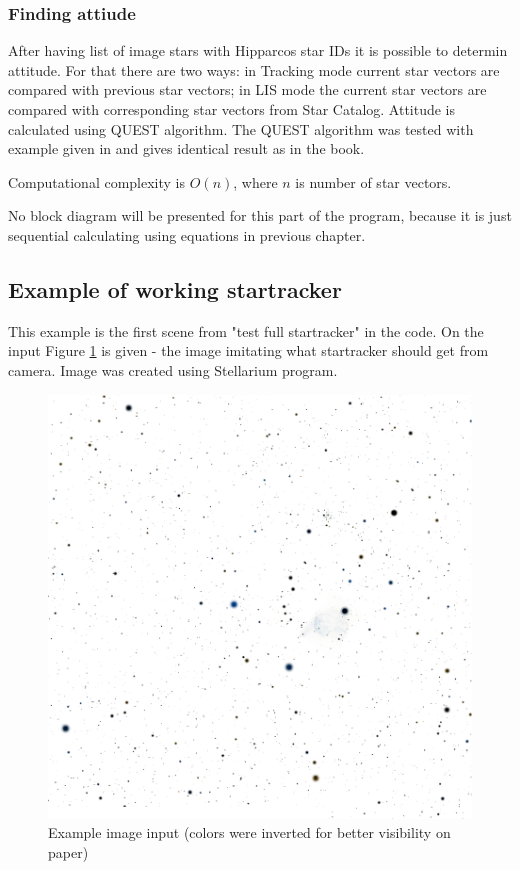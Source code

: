 \documentclass[12pt,a4paper,oneside]{article}
\begin{document}
\subsubsection{Finding attiude}
After having list of image stars with Hipparcos star IDs it is possible to determin attitude. For that there are two ways: in Tracking mode current star vectors are compared with previous star vectors; in LIS mode the current star vectors are compared with corresponding star vectors from Star Catalog. Attitude is calculated using QUEST algorithm. The QUEST algorithm was tested with example given in \cite{hall2003spacecraft} and gives identical result as in the book.

Computational complexity is $O(n)$, where $n$ is number of star vectors.

No block diagram will be presented for this part of the program, because it is just sequential calculating using equations in previous chapter.

\subsection{Example of working startracker}

This example is the first scene from "test full startracker" in the code. On the input Figure \ref{fig:example_0} is given - the image imitating what startracker should get from camera. Image was created using Stellarium program.

\begin{figure}[!htbp]
\includegraphics[scale=0.4]{example_0.png}
\centering
\caption{Example image input (colors were inverted for better visibility on paper)}
\label{fig:example_0}
\end{figure}
\end{document}
